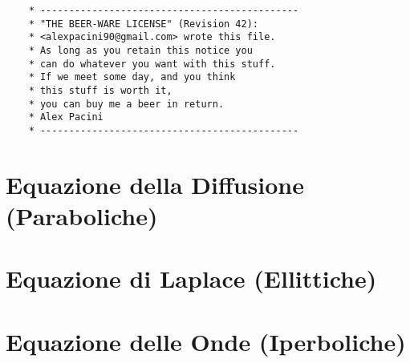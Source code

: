 \documentclass[a4paper]{report}
\begin{document}


\newpage
%
\null
\vfill
\begin{verbatim}
	* ---------------------------------------------
	* "THE BEER-WARE LICENSE" (Revision 42):
	* <alexpacini90@gmail.com> wrote this file. 
	* As long as you retain this notice you
	* can do whatever you want with this stuff. 
	* If we meet some day, and you think
	* this stuff is worth it, 
	* you can buy me a beer in return.
	* Alex Pacini
	* ---------------------------------------------
\end{verbatim}

\newpage
\tableofcontents
\newpage

\chapter{Equazione della Diffusione (Paraboliche)}	\label{chap:diffusion}


\chapter{Equazione di Laplace (Ellittiche)}	\label{chap:laplacian}


\chapter{Equazione delle Onde (Iperboliche)}	\label{chap:waves}


\listoffigures
\end{document}
